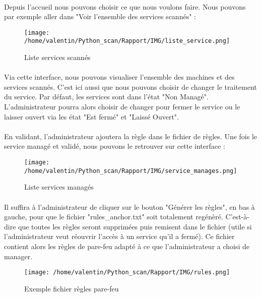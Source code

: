 \documentclass[12pt]{report}
\begin{document}
	\paragraph{}
		Depuis l'accueil nous pouvons choisir ce que nous voulons faire. Nous pouvons par exemple aller dans "Voir l'ensemble des services scannés" :
		\begin{figure}[ht]
			\begin{center}\texttt{[image: /home/valentin/Python\_scan/Rapport/IMG/liste\_service.png]}
			\caption{\label{list_service} Liste services scannés}\end{center}
		\end{figure}
	\paragraph{}
		Via cette interface, nous pouvons visualiser l'ensemble des machines et des services scannés. C'est ici aussi que nous pouvons choisir de changer le traitement du service. Par défaut, les services sont dans l'état "Non Managé". L'administrateur pourra alors choisir de changer pour fermer le service ou le laisser ouvert via les état "Est fermé" et "Laissé Ouvert".
	\paragraph{}
		En validant, l'administrateur ajoutera la règle dans le fichier de règles. Une fois le service managé et validé, nous pouvons le retrouver sur cette interface :
		\begin{figure}[ht]
			\begin{center}\texttt{[image: /home/valentin/Python\_scan/Rapport/IMG/service\_manages.png]}
			\caption{\label{service_manage} Liste services managés}\end{center}
		\end{figure}
	\paragraph{}
		Il suffira à l'administrateur de cliquer sur le bouton "Générer les règles", en bas à gauche, pour que le fichier "rules\_anchor.txt" soit totalement regénèré. C'est-à-dire que toutes les règles seront supprimées puis remisent dans le fichier (utile si l'administrateur veut réouvrir l'accès à un service qu'il a fermé). Ce fichier contient alors les règles de pare-feu adapté à ce que l'administrateur a choisi de manager.
		\begin{figure}[ht]
			\begin{center}\texttt{[image: /home/valentin/Python\_scan/Rapport/IMG/rules.png]}
			\caption{\label{rules} Exemple fichier règles pare-feu}\end{center}
		\end{figure}
\end{document}
